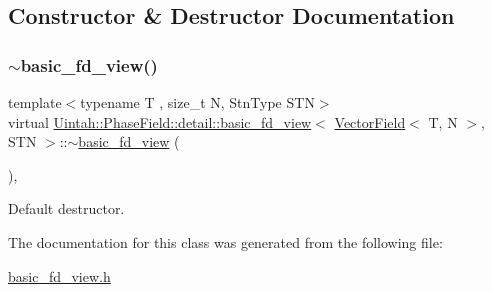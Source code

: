 \subsection{Constructor \& Destructor Documentation}
\mbox{\label{classUintah_1_1PhaseField_1_1detail_1_1basic__fd__view_3_01VectorField_3_01T_00_01N_01_4_00_01STN_01_4_ac602ec10bc7689756306f5a8a89ba8ee}} 
\subsubsection{\texorpdfstring{$\sim$basic\+\_\+fd\+\_\+view()}{~basic\_fd\_view()}}
{\footnotesize\ttfamily template$<$typename T , size\+\_\+t N, Stn\+Type S\+TN$>$ \\
virtual \hyperlink{classUintah_1_1PhaseField_1_1detail_1_1basic__fd__view}{Uintah\+::\+Phase\+Field\+::detail\+::basic\+\_\+fd\+\_\+view}$<$ \hyperlink{structUintah_1_1PhaseField_1_1VectorField}{Vector\+Field}$<$ T, N $>$, S\+TN $>$\+::$\sim$\hyperlink{classUintah_1_1PhaseField_1_1detail_1_1basic__fd__view}{basic\+\_\+fd\+\_\+view} (\begin{DoxyParamCaption}{ }\end{DoxyParamCaption})\hspace{0.3cm}{\ttfamily [virtual]}, {\ttfamily [default]}}



Default destructor. 



The documentation for this class was generated from the following file\+:\begin{DoxyCompactItemize}
\item 
\hyperlink{basic__fd__view_8h}{basic\+\_\+fd\+\_\+view.\+h}\end{DoxyCompactItemize}
